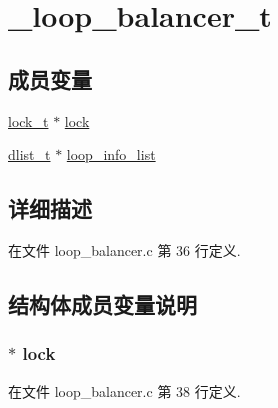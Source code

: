 \hypertarget{struct__loop__balancer__t}{}\section{\+\_\+loop\+\_\+balancer\+\_\+t}
\label{struct__loop__balancer__t}
\subsection*{成员变量}
\begin{DoxyCompactItemize}
\item 
\hyperlink{config_8h_ad3e00e0eb0c79dfd77ff2ff833f49c7d}{lock\+\_\+t} $\ast$ \hyperlink{struct__loop__balancer__t_abf14bc3bc3eb5e72e92811fcc36b5063}{lock}
\item 
\hyperlink{config_8h_ad6644d67df4b4e3596c1eb12977d1d16}{dlist\+\_\+t} $\ast$ \hyperlink{struct__loop__balancer__t_a155f9bd11162f8dd3610c1ca6222ba9d}{loop\+\_\+info\+\_\+list}
\end{DoxyCompactItemize}


\subsection{详细描述}


在文件 loop\+\_\+balancer.\+c 第 36 行定义.



\subsection{结构体成员变量说明}
\hypertarget{struct__loop__balancer__t_abf14bc3bc3eb5e72e92811fcc36b5063}{}
\subsubsection[{lock}]{$\ast$ lock}\label{struct__loop__balancer__t_abf14bc3bc3eb5e72e92811fcc36b5063}


在文件 loop\+\_\+balancer.\+c 第 38 行定义.

\hypertarget{struct__loop__balancer__t_a155f9bd11162f8dd3610c1ca6222ba9d}{}

